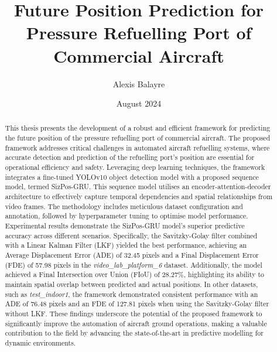 \documentclass[12pt,oneside]{book} %
\title{Future Position Prediction for Pressure Refuelling Port
    of Commercial Aircraft}
\author{Alexis Balayre}
\date{August 2024}
\begin{document}
%
%

\frontmatter

\maketitle

\begin{abstract}

    This thesis presents the development of a robust and efficient framework for
    predicting the future position of the pressure refuelling port of commercial
    aircraft. The proposed framework addresses critical challenges in automated
    aircraft refuelling systems, where accurate detection and prediction of the
    refuelling port's position are essential for operational efficiency and safety.
    Leveraging deep learning techniques, the framework integrates a fine-tuned
    YOLOv10 object detection model with a proposed sequence model, termed
    SizPos-GRU. This sequence model utilises an encoder-attention-decoder
    architecture to effectively capture temporal dependencies and spatial
    relationships from video frames. The methodology includes meticulous dataset
    configuration and annotation, followed by hyperparameter tuning to optimise
    model performance. Experimental results demonstrate the SizPos-GRU model's
    superior predictive accuracy across different scenarios. Specifically, the
    Savitzky-Golay filter combined with a Linear Kalman Filter (LKF) yielded the
    best performance, achieving an Average Displacement Error (ADE) of 32.45 pixels
    and a Final Displacement Error (FDE) of 57.98 pixels in the
    \textit{video\_lab\_platform\_6} dataset. Additionally, the model achieved a
    Final Intersection over Union (FIoU) of 28.27\%, highlighting its ability to
    maintain spatial overlap between predicted and actual positions. In other
    datasets, such as \textit{test\_indoor1}, the framework demonstrated consistent
    performance with an ADE of 76.48 pixels and an FDE of 127.81 pixels when using
    the Savitzky-Golay filter without LKF. These findings underscore the potential
    of the proposed framework to significantly improve the automation of aircraft
    ground operations, making a valuable contribution to the field by advancing the
    state-of-the-art in predictive modelling for dynamic environments.

\end{abstract}
\end{document}
